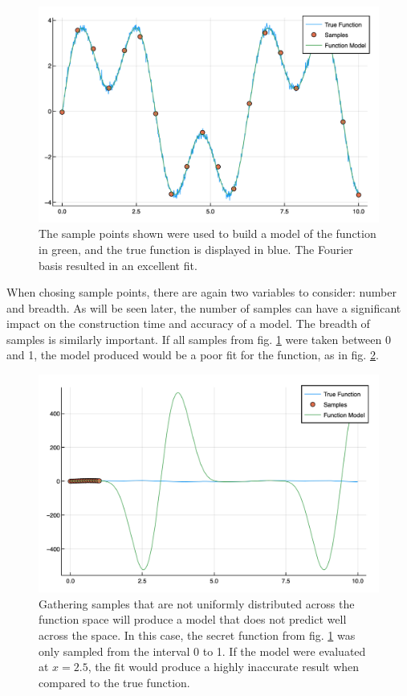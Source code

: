 \begin{figure}%
\centering
\includegraphics[scale = 0.35]{Figures/2dFourier}
\caption{The sample points shown were used to build a model of the function in green, and the true function is displayed in blue. The Fourier basis resulted in an excellent fit. 
\label{fig:2dFourier}} 
\end{figure}

\par When chosing sample points, there are again two variables to consider: number and breadth. As will be seen later, the number of samples can have a significant impact on the construction time and accuracy of a model. The breadth of samples is similarly important. If all samples from fig. \ref{fig:2dFourier} were taken between 0 and 1, the model produced would be a poor fit for the function, as in fig. \ref{fig:poorSamps}. 

\begin{figure}%
\centering
\includegraphics[scale = 0.5]{Figures/poorSamps}
\caption{Gathering samples that are not uniformly distributed across the function space will produce a model that does not predict well across the space. In this case, the secret function from fig. \ref{fig:2dFourier} was only sampled from the interval 0 to 1. If the model were evaluated at $x=2.5$, the fit would produce a highly inaccurate result when compared to the true function.
\label{fig:poorSamps}} 
\end{figure}

